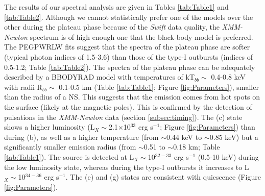 \documentclass[a4paper,fleqn,usenatbib]{mnras}
\begin{document}
\indent The results of our spectral analysis are given in Tables \ref{tab:Table1} and \ref{tab:Table2}. Although we cannot statistically prefer one of the models over the other during the plateau phase because of the \textit{Swift} data quality, the \textit{XMM-Newton} spectrum is of high enough one that the black-body model is preferred. The PEGPWRLW fits suggest that the spectra of the plateau phase are softer (typical photon indices of 1.5-3.6) than those of the type-I outbursts (indices of 0.5-1.2; Table \ref{tab:Table2}). The spectra of the plateau phase can be adequately described by a BBODYRAD model with temperatures of kT$_{bb}\sim$ 0.4-0.8 keV with radii R$_{bb}\sim$ 0.1-0.5 km (Table \ref{tab:Table1}; Figure \ref{fig:Parameters}), smaller than the radius of a NS. This suggests that the emission comes from hot spots on the surface (likely at the magnetic poles). This is confirmed by the detection of pulsations in the \textit{XMM-Newton} data (section \ref{subsec:timing}). The (c) state shows a higher luminosity (L${_X}\sim$2.1$\times$10$^{33}$ erg s$^{-1}$; Figure \ref{fig:Parameters}) than during (b), as well as a higher temperature (from $\sim$0.44 keV to $\sim$0.85 keV) but a significantly smaller emission radius (from $\sim$0.51 to $\sim$0.18 km; Table \ref{tab:Table1}). The source is detected at L${_X}\sim$10$^{32-33}$ erg s$^{-1}$ (0.5-10 keV) during the low luminosity state, whereas during the type-I outbursts it increases to L${_X}\sim$10$^{34-36}$ erg s$^{-1}$. The (e) and (g) states are consistent with quiescence (Figure \ref{fig:Parameters}).\\
\end{document}
